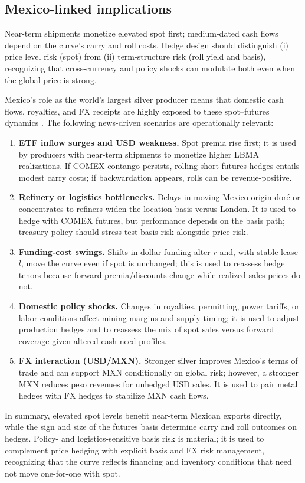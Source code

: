 \documentclass[10pt,a4paper]{article} %
\begin{document}
\subsection{Mexico-linked implications}
Near-term shipments monetize elevated spot first; medium-dated cash flows depend on the curve’s carry and roll costs. Hedge design should distinguish (i) price level risk (spot) from (ii) term-structure risk (roll yield and basis), recognizing that cross-currency and policy shocks can modulate both even when the global price is strong.

Mexico’s role as the world’s largest silver producer means that domestic cash flows, royalties, and FX receipts are highly exposed to these spot–futures dynamics \citep{reuters_mx_top_silver}. The following news-driven scenarios are operationally relevant:
\begin{enumerate}
  \item \textbf{ETF inflow surges and USD weakness.} Spot premia rise first; it is used by producers with near-term shipments to monetize higher LBMA realizations. If COMEX contango persists, rolling short futures hedges entails modest carry costs; if backwardation appears, rolls can be revenue-positive.
  \item \textbf{Refinery or logistics bottlenecks.} Delays in moving Mexico-origin doré or concentrates to refiners widen the location basis versus London. It is used to hedge with COMEX futures, but performance depends on the basis path; treasury policy should stress-test basis risk alongside price risk.
  \item \textbf{Funding-cost swings.} Shifts in dollar funding alter \(r\) and, with stable lease \(l\), move the curve even if spot is unchanged; this is used to reassess hedge tenors because forward premia/discounts change while realized sales prices do not.
  \item \textbf{Domestic policy shocks.} Changes in royalties, permitting, power tariffs, or labor conditions affect mining margins and supply timing; it is used to adjust production hedges and to reassess the mix of spot sales versus forward coverage given altered cash-need profiles.
  \item \textbf{FX interaction (USD/MXN).} Stronger silver improves Mexico’s terms of trade and can support MXN conditionally on global risk; however, a stronger MXN reduces peso revenues for unhedged USD sales. It is used to pair metal hedges with FX hedges to stabilize MXN cash flows.
\end{enumerate}
In summary, elevated spot levels benefit near-term Mexican exports directly, while the sign and size of the futures basis determine carry and roll outcomes on hedges. Policy- and logistics-sensitive basis risk is material; it is used to complement price hedging with explicit basis and FX risk management, recognizing that the curve reflects financing and inventory conditions that need not move one-for-one with spot.
\end{document}
